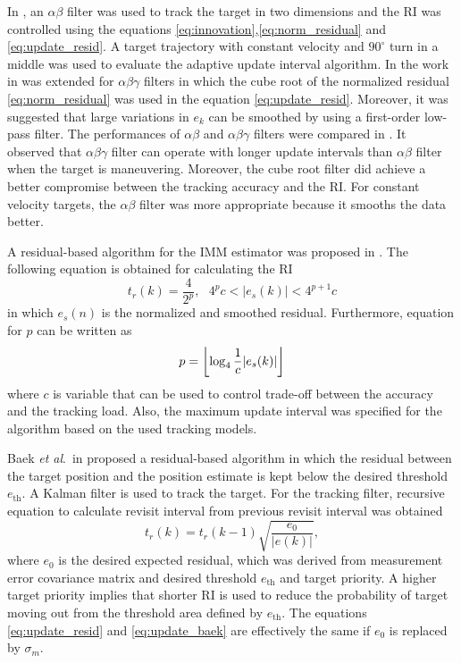 \documentclass[english, 12pt, a4paper, elec, utf8, a-1b, online]{aaltothesis}
\newcommand{\etal}{\textit{et al}.~}
\DeclarePairedDelimiter\floor{\lfloor}{\rfloor}
\begin{document}
In \cite{Cohen1986}, an $\alpha \beta$ filter \cite{Brookner1998} was used to track the target in two dimensions and the RI was controlled using the equations \eqref{eq:innovation},\eqref{eq:norm_residual} and \eqref{eq:update_resid}.
A target trajectory with constant velocity and $90^\circ$ turn in a middle was used to evaluate the adaptive update interval algorithm.
In \cite{Gardner1988} the work in \cite{Cohen1986} was extended for $\alpha\beta\gamma$ filters \cite{Brookner1998} in which the cube root of the normalized residual \eqref{eq:norm_residual} was used in the equation \eqref{eq:update_resid}.
Moreover, it was suggested that large variations in $e_k$ can be smoothed by using a first-order low-pass filter.
The performances of $\alpha\beta$ and $\alpha\beta\gamma$ filters were compared in \cite{Munu1992}.
It observed that $\alpha\beta\gamma$ filter can operate with longer update intervals than $\alpha\beta$ filter when the target is maneuvering.
Moreover, the cube root filter did achieve a better compromise between the tracking accuracy and the RI.     
For constant velocity targets, the $\alpha\beta$ filter was more appropriate because it smooths the data better.

A residual-based algorithm for the IMM estimator was proposed in \cite{ChengTing2007}.
The following equation is obtained for calculating the RI
\begin{equation}
    t_r(k) = \frac{4}{2^p}, \text{ } 4^p c < |e_s(k)| < 4^{p+1}c
\end{equation}
in which $e_s(n)$ is the normalized and smoothed residual.
Furthermore, equation for $p$ can be written as
\begin{equation}
    p = \floor*{\log_4\frac{1}{c}|e_s(k)|}
\end{equation}
where $c$ is variable that can be used to control trade-off between the accuracy and the tracking load.
Also, the maximum update interval was specified for the algorithm based on the used tracking models.

Baek \etal in \cite{Baek2010} proposed a residual-based algorithm in which the residual between the target position and the position estimate is kept below the desired threshold $e_\text{th}$.
A Kalman filter is used to track the target.
For the tracking filter, recursive equation to calculate revisit interval from previous revisit interval was obtained
\begin{equation}\label{eq:update_baek}
    t_r(k) = t_r(k - 1) \sqrt{\frac{e_0}{|e(k)|}},
\end{equation}
where $e_0$ is the desired expected residual, which was derived from measurement error covariance matrix and desired threshold $e_\text{th}$ and target priority.
A higher target priority implies that shorter RI is used to reduce the probability of target moving out from the threshold area defined by $e_\text{th}$.
The equations \eqref{eq:update_resid} and \eqref{eq:update_baek} are effectively the same if $e_0$ is replaced by $\sigma_m$.
\end{document}
